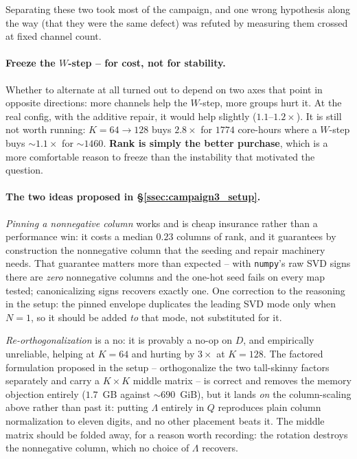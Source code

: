 \documentclass{article}
\numberwithin{equation}{section}   %
\begin{document}
\par\noindent
Separating these two took most of the campaign, and one wrong hypothesis along the way (that they
were the same defect) was refuted by measuring them crossed at fixed channel count.

\paragraph{Freeze the $W$-step -- for cost, not for stability.}
Whether to alternate at all turned out to depend on two axes that point in opposite directions:
more channels help the $W$-step, more groups hurt it. At the real config, with the additive repair,
it would help slightly ($1.1$--$1.2\times$). It is still not worth running: $K = 64 \to 128$ buys
$2.8\times$ for $1774$ core-hours where a $W$-step buys $\sim 1.1\times$ for $\sim 1460$.
{\bf Rank is simply the better purchase}, which is a more comfortable reason to freeze than the
instability that motivated the question.

\paragraph{The two ideas proposed in \S\ref{ssec:campaign3_setup}.}
{\em Pinning a nonnegative column} works and is cheap insurance rather than a performance win: it
costs a median $0.23$ columns of rank, and it guarantees by construction the nonnegative column
that the seeding and repair machinery needs. That guarantee matters more than expected -- with
{\tt numpy}'s raw SVD signs there are {\em zero} nonnegative columns and the one-hot seed fails on
every map tested; canonicalizing signs recovers exactly one. One correction to the reasoning in the
setup: the pinned envelope duplicates the leading SVD mode only when $N = 1$, so it should be added
{\em to} that mode, not substituted for it.

{\em Re-orthogonalization} is a no: it is provably a no-op on $D$, and empirically unreliable,
helping at $K = 64$ and hurting by $3\times$ at $K = 128$. The factored formulation proposed in the
setup -- orthogonalize the two tall-skinny factors separately and carry a $K \times K$ middle
matrix -- is correct and removes the memory objection entirely ($1.7$~GB against $\sim 690$~GiB),
but it lands {\em on} the column-scaling above rather than past it: putting $\Lambda$ entirely in
$Q$ reproduces plain column normalization to eleven digits, and no other placement beats it. The
middle matrix should be folded away, for a reason worth recording: the rotation destroys the
nonnegative column, which no choice of $\Lambda$ recovers.
\end{document}
